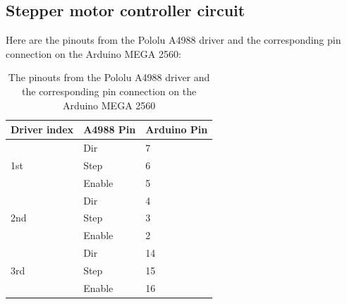 \subsection{Stepper motor controller circuit}

Here are the pinouts from the Pololu A4988 driver and the corresponding pin connection on the Arduino MEGA 2560:
\begin{table}[H]
	\centering
	\caption{The pinouts from the Pololu A4988 driver and the corresponding pin connection on the Arduino MEGA 2560}	
	\label{tab:A4988_connectto_Arduino}
	\begin{tabularx}{0.65\textwidth}{lll}
		\toprule
		\textbf{Driver index} & \textbf{A4988 Pin} & \textbf{Arduino Pin} \\
		\midrule
		\multirow{3}{*}{1st}	& Dir       & 7            \\
		                   	 	& Step      & 6            \\
		                   	 	& Enable    & 5            \\
		\midrule
		\multirow{3}{*}{2nd} 	& Dir       & 4            \\
		                   	 	& Step      & 3            \\
		                   	 	& Enable    & 2            \\
       	\midrule
      	\multirow{3}{*}{3rd} 	& Dir       & 14           \\
		                   	 	& Step      & 15           \\
		                   		& Enable    & 16           \\
		\bottomrule
	\end{tabularx}
\end{table}

